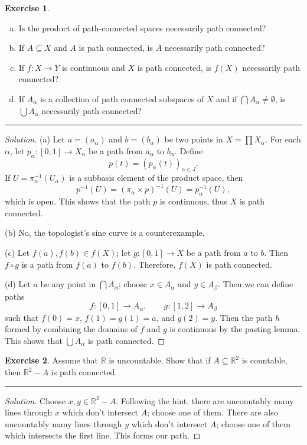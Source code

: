 \documentclass{article}
\theoremstyle{definition}
\newtheorem{exercise}{Exercise}[section]
\begin{document}
\begin{exercise}
  \begin{enumerate}[(a)]
    \item Is the product of path-connected spaces necessarily path connected?
    \item If $A\subseteq X$ and $A$ is path connected, is $\bar{A}$ necessarily path connected?
    \item If $f:X\to Y$ is continuous and $X$ is path connected, is $f(X)$ necessarily path connected?
    \item If $A_\alpha$ is a collection of path connected subspaces of $X$ and if $\bigcap A_\alpha\ne\emptyset$, is $\bigcup A_\alpha$ necessarily path connected?
  \end{enumerate}
\end{exercise}
\hrule
\begin{proof}[Solution]
  (a) Let $a = (a_\alpha)$ and $b = (b_\alpha)$ be two points in $X = \prod X_\alpha$. For each $\alpha$, let $p_\alpha:[0,1]\to X_\alpha$ be a path from $a_\alpha$ to $b_\alpha$. Define
  $$p(t) = (p_\alpha(t))_{\alpha\in J}.$$
  If $U = \pi_\alpha^{-1}(U_\alpha)$ is a subbasis element of the product space, then
  $$p^{-1}(U) = (\pi_\alpha\times p)^{-1}(U) = p_\alpha^{-1}(U),$$
  which is open. This shows that the path $p$ is continuous, thus $X$ is path connected.

  (b) No, the topologist's sine curve is a counterexample.

  (c) Let $f(a),f(b)\in f(X)$; let $g:[0,1]\to X$ be a path from $a$ to $b$. Then $f\circ g$ is a path from $f(a)$ to $f(b)$. Therefore, $f(X)$ is path connected.

  (d) Let $a$ be any point in $\bigcap A_\alpha$; choose $x\in A_\alpha$ and $y\in A_\beta$. Then we can define paths
  $$f:[0,1]\to A_\alpha,\qquad g:[1,2]\to A_\beta$$
  such that $f(0) = x$, $f(1) = g(1) = a$, and $g(2) = y$. Then the path $h$ formed by combining the domains of $f$ and $g$ is continuous by the pasting lemma. This shows that $\bigcup A_\alpha$ is path connected.
\end{proof}

\pagebreak

\begin{exercise}
  Assume that $\mathbb{R}$ is uncountable. Show that if $A\subseteq\mathbb{R}^2$ is countable, then $\mathbb{R}^2 - A$ is path connected.
\end{exercise}
\hrule
\begin{proof}[Solution]
  Choose $x,y\in\mathbb{R}^2 - A$. Following the hint, there are uncountably many lines through $x$ which don't intersect $A$; choose one of them. There are also uncountably many lines through $y$ which don't intersect $A$; choose one of them which intersects the first line. This forms our path.
\end{proof}
\end{document}
